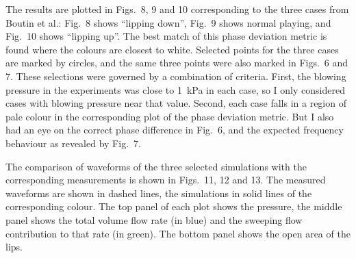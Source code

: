   The results are plotted in Figs.\ 8, 9 and 10 corresponding to the three 
  cases from Boutin et al.: Fig.\ 8 shows ``lipping down'', Fig.\ 9 shows 
  normal playing, and Fig.\ 10 shows ``lipping up''. The best match of this 
  phase deviation metric is found where the colours are closest to white. 
  Selected points for the three cases are marked by circles, and the same three 
  points were also marked in Figs.\ 6 and 7. These selections were governed by 
  a combination of criteria. First, the blowing pressure in the experiments was 
  close to 1~kPa in each case, so I only considered cases with blowing pressure 
  near that value. Second, each case falls in a region of pale colour in the 
  corresponding plot of the phase deviation metric. But I also had an eye on 
  the correct phase difference in Fig.\ 6, and the expected frequency behaviour 
  as revealed by Fig.\ 7. 




  The comparison of waveforms of the three selected simulations with the 
  corresponding measurements is shown in Figs.\ 11, 12 and 13. The measured 
  waveforms are shown in dashed lines, the simulations in solid lines of the 
  corresponding colour. The top panel of each plot shows the pressure, the 
  middle panel shows the total volume flow rate (in blue) and the sweeping flow 
  contribution to that rate (in green). The bottom panel shows the open area of 
  the lips. 

